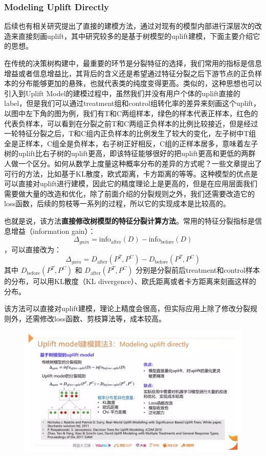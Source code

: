 \documentclass[12pt]{article}
\begin{document}
\subsubsection{Modeling Uplift Directly}
后续也有相关研究提出了直接的建模方法，通过对现有的模型内部进行深层次的改造来直接刻画uplift，其中研究较多的是基于树模型的uplift建模，下面主要介绍它的思想。

在传统的决策树构建中，最重要的环节是分裂特征的选择，我们常用的指标是信息增益或者信息增益比，其背后的含义还是希望通过特征分裂之后下游节点的正负样本的分布能够更加的悬殊，也就代表类的纯度变得更高。类似的，这种思想也可以引入到Uplift Model的建模过程中，虽然我们并没有用户个体的uplift直接的label，但是我们可以通过treatment组和control组转化率的差异来刻画这个uplift，以图中左下角的图为例，我们有T和C两组样本，绿色的样本代表正样本，红色的代表负样本，可以看到在分裂之前T和C两组正负样本的比例比较接近，但是经过一轮特征分裂之后，T和C组内正负样本的比例发生了较大的变化，左子树中T组全是正样本，C组全是负样本，右子树正好相反，C组的正样本居多，意味着左子树的uplift比右子树的uplift更高，即该特征能够很好的把uplift更高和更低的两群人做一个区分。如何从数学上度量这种概率分布的差异的方式呢？一些文章提出了可行的方法，比如基于KL散度，欧式距离，卡方距离的等等。这种模型的优点是可以直接对uplift进行建模，因此它的精度理论上是更高的，但是在应用层面我们需要做大量的改造和优化，除了前面介绍的分裂规则之外，我们还需要改造它的loss函数，后续的剪枝等一系列的过程，所以它的实现成本是比较高的。

也就是说\cite{Uplift_Model_Principle_And_Practice}，该方法\textbf{直接修改树模型的特征分裂计算方法}。常用的特征分裂指标是信息增益（information gain）：
$$
\Delta_{gain} = \text{info}_{\text{after}}(D) - \text{info}_{\text{before}}(D)
$$
，可以直接改为：
$$
\Delta_{gain} = D_{\text{after}}(P^T, P^C) - D_{\text{before}}(P^T, P^C)
$$
其中 $D_{\text{before}}(P^T, P^C)$ 和 $D_{\text{after}}(P^T, P^C)$ 分别是分裂前后treatment和control样本的分布，可以用KL散度（KL divergence）、欧氏距离或者卡方距离来刻画这样的分布。

该方法可以直接对uplift建模，理论上精度会很高，但实际应用上除了修改分裂规则外，还需修改loss函数、剪枝算法等，成本较高。

\begin{figure}[H]
    \centering
    \includegraphics[width=1\textwidth]{fig/CasualInference-Uplift-Model-Direct-Model.png}
\end{figure}
\end{document}
